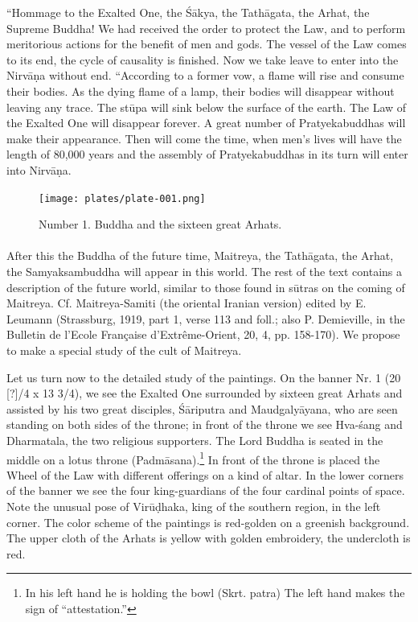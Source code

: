 \documentclass[a4paper, 12pt, oneside]{article}
\begin{document}
``Hommage to the Exalted One, the \'{S}\={a}kya, the Tath\={a}gata, the Arhat, the Supreme Buddha! We had received the order to protect the Law, and to perform meritorious actions for the benefit of men and gods. The vessel of the Law comes to its end, the cycle of causality is finished. Now we take leave to enter into the Nirv\={a}\d{n}a without end. ``According to a former vow, a flame will rise and consume their bodies. As the dying flame of a lamp, their bodies will disappear without leaving any trace. The st\={u}pa will sink below the surface of the earth. The Law of the Exalted One will disappear forever. A great number of Pratyekabuddhas will make their appearance. Then will come the time, when men's lives will have the length of 80,000 years and the assembly of Pratyekabuddhas in its turn will enter into Nirv\={a}\d{n}a.
\clearpage
\vspace*{\fill}
\begin{figure}[H]
\centering
\texttt{[image: plates/plate-001.png]}
\caption*{Number 1. Buddha and the sixteen great Arhats.}
\end{figure}
\vspace*{\fill}
\clearpage
\paragraph{}
After this the Buddha of the future time, Maitreya, the Tath\={a}gata, the Arhat, the Samyaksambuddha will appear in this world. The rest of the text contains a description of the future world, similar to those found in s\={u}tras on the coming of Maitreya. Cf. Maitreya-Samiti (the oriental Iranian version) edited by E. Leumann (Strassburg, 1919, part 1, verse 113 and foll.; also P. Demieville, in the Bulletin de l'Ecole Française d'Extrême-Orient, 20, 4, pp. 158-170). We propose to make a special study of the cult of Maitreya.

Let us turn now to the detailed study of the paintings. On the banner Nr. 1 (20 [?]/4 x 13 3/4), we see the Exalted One surrounded by sixteen great Arhats and assisted by his two great disciples, \'{S}\={a}riputra and Maudgaly\={a}yana, who are seen standing on both sides of the throne; in front of the throne we see Hva-\'{s}ang and Dharmatala, the two religious supporters. The Lord Buddha is seated in the middle on a lotus throne (Padm\={a}sana).\footnote{In his left hand he is holding the bowl (Skrt. patra) The left hand makes the sign of ``attestation.''} In front of the throne is placed the Wheel of the Law with different offerings on a kind of altar. In the lower corners of the banner we see the four king-guardians of the four cardinal points of space. Note the unusual pose of Vir\={u}\d{d}haka, king of the southern region, in the left corner. The color scheme of the paintings is red-golden on a greenish background. The upper cloth of the Arhats is yellow with golden embroidery, the undercloth is red.
\end{document}
